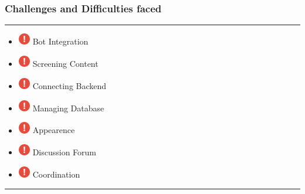 \documentclass[14pt]{beamer}
\begin{document}
\begin{frame}
    \frametitle{Challenges and Difficulties faced}
    \noindent
    {\color{pink} \rule{\linewidth}{0.7mm} }
    \begin{itemize}
    \item [] \includegraphics[width=0.2in, height=0.2in]{./logos/exclamation.png} Bot Integration\\
        \pause
    \item [] \includegraphics[width=0.2in, height=0.2in]{./logos/exclamation.png} Screening Content\\
        \pause
    \item [] \includegraphics[width=0.2in, height=0.2in]{./logos/exclamation.png} Connecting Backend\\
        \pause
    \item [] \includegraphics[width=0.2in, height=0.2in]{./logos/exclamation.png} Managing Database\\
        \pause
    \item [] \includegraphics[width=0.2in, height=0.2in]{./logos/exclamation.png} Appearence\\
        \pause
    \item [] \includegraphics[width=0.2in, height=0.2in]{./logos/exclamation.png} Discussion Forum\\
        \pause
    \item [] \includegraphics[width=0.2in, height=0.2in]{./logos/exclamation.png} Coordination\\
\end{itemize}
\noindent
    {\color{pink} \rule{\linewidth}{0.7mm} }
\end{frame}
\end{document}
